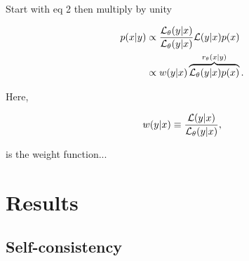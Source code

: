 \documentclass[aps,superscriptaddress,twocolumn,nopreprintnumbers,floatfix,groupedaddress]{revtex4-1}
\newcommand{\emcee}{{\sc emcee}\xspace}
\newcommand{\ptemcee}{{\sc ptemcee}\xspace}
\newcommand{\nessai}{{\sc Nessai}\xspace}
\newcommand{\vitamin}{{\sc VItamin}\xspace}
\newcommand{\dynesty}{{\sc dynesty}\xspace}
\newcommand{\cpnest}{{\sc cpnest}\xspace}
\begin{document}
Start with eq 2 then multiply by unity

\begin{align}\label{eq:sir} 
p(x|y) &\propto \frac{{\cal L}_\theta(y|x)}{{\cal L}_\theta(y|x)}{\cal L}(y|x) p(x)\nonumber\\
&\propto w(y|x)\overbrace{{\cal L}_{\theta}(y|x) p(x)}^{r_{\theta}(x|y)}.
\end{align}

Here,

\begin{align}\label{eq:weights}
w(y|x) \equiv \frac{{\cal L}(y|x)}{{\cal L}_{\theta}(y|x)},
\end{align}

is the weight function...

\section{Results}\label{results}

\subsection{Self-consistency}
\end{document}

